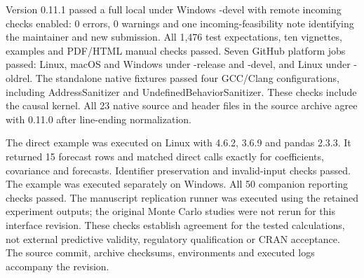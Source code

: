 Version 0.11.1 passed a full local 
under Windows -devel with remote incoming checks enabled:
0 errors, 0 warnings and one incoming-feasibility note identifying the
maintainer and new submission. All 1,476 test expectations, ten vignettes,
examples and PDF/HTML manual checks passed. Seven GitHub platform jobs
passed: Linux, macOS and Windows under -release and
-devel, and Linux under -oldrel. The standalone
native fixtures passed four GCC/Clang configurations, including
AddressSanitizer and UndefinedBehaviorSanitizer. These checks include
the causal kernel. All 23 native source and header files in the source
archive agree with 0.11.0 after line-ending normalization.

The direct  example was executed on Linux with 
4.6.2,  3.6.9 and pandas 2.3.3. It returned 15 forecast rows
and matched direct  calls exactly for coefficients, covariance
and forecasts. Identifier preservation and invalid-input checks passed.
The  example was executed separately on Windows. All 50
companion reporting checks passed. The manuscript replication runner
was executed using the retained experiment outputs; the original Monte
Carlo studies were not rerun for this interface revision. These checks
establish agreement for the tested calculations, not external predictive
validity, regulatory qualification or CRAN acceptance. The source commit,
archive checksums, environments and executed logs accompany the revision.
